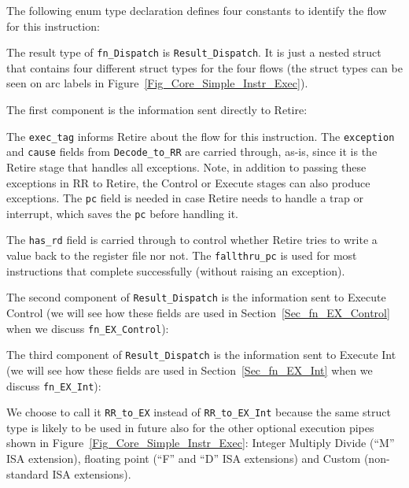 The following enum type declaration defines four constants to identify
the flow for this instruction:



The result type of \verb|fn_Dispatch| is \verb|Result_Dispatch|.  It
is just a nested struct that contains four different struct types for
the four flows (the struct types can be seen on arc labels in
Figure~\ref{Fig_Core_Simple_Instr_Exec}).



The first component is the information sent directly to Retire:



The \verb|exec_tag| informs Retire about the flow for this
instruction.  The {\tt exception} and {\tt cause} fields from
\verb|Decode_to_RR| are carried through, as-is, since it is the Retire
stage that handles all exceptions.  Note, in addition to passing these
exceptions in RR to Retire, the Control or Execute stages can also
produce exceptions.  The {\tt pc} field is needed in case Retire needs
to handle a trap or interrupt, which saves the {\tt pc} before
handling it.

The \verb|has_rd| field is carried through to control whether Retire
tries to write a value back to the register file nor not.  The
\verb|fallthru_pc| is used for most instructions that complete
successfully (without raising an exception).

The second component of \verb|Result_Dispatch| is the information sent
to Execute Control (we will see how these fields are used in
Section~\ref{Sec_fn_EX_Control} when we discuss \verb|fn_EX_Control|):



The third component of \verb|Result_Dispatch| is the information sent
to Execute Int (we will see how these fields are used in
Section~\ref{Sec_fn_EX_Int} when we discuss \verb|fn_EX_Int|):



We choose to call it \verb|RR_to_EX| instead of \verb|RR_to_EX_Int|
because the same struct type is likely to be used in future also for
the other optional execution pipes shown in
Figure~\ref{Fig_Core_Simple_Instr_Exec}: Integer Multiply Divide
(``M'' ISA extension), floating point (``F'' and ``D'' ISA extensions)
and Custom (non-standard ISA extensions).

